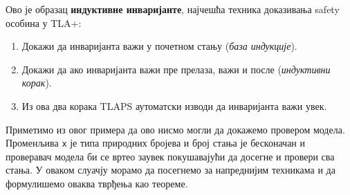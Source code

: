 \begin{primer}
Ово је образац \textbf{индуктивне инваријанте}, најчешћа техника доказивања safety особина у TLA+:
\begin{enumerate}
    \item Докажи да инваријанта важи у почетном стању (\textit{база индукције}).
    \item Докажи да ако инваријанта важи пре прелаза, важи и после (\textit{индуктивни корак}).
    \item Из ова два корака TLAPS аутоматски изводи да инваријанта важи увек.
\end{enumerate}
Приметимо из овог примера да ово нисмо могли да докажемо провером модела. Променљива \texttt{x} је типа 
природних бројева и број стања је бесконачан и проверавач модела би се вртео заувек покушавајући да досегне 
и провери сва стања. У оваком слуачју морамо да посегнемо за напреднијим техникама и да формулишемо оваква
тврђења као теореме.
\end{primer}
